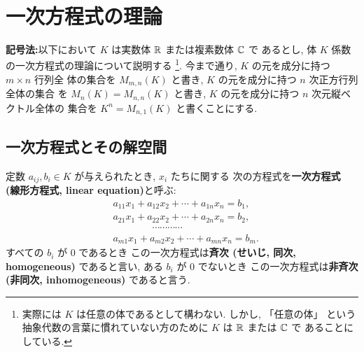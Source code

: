 \documentclass[12pt,twoside]{jarticle}
\begin{document}

\section{一次方程式の理論}

\noindent
{\large 
{\bf 記号法:}\enspace 以下において $K$ は実数体 ${\mathbb R}$ または複素数体 ${\mathbb C}$ で
あるとし, 体 $K$ 係数の一次方程式の理論について説明する%
\footnote{実際には $K$ は任意の体であるとして構わない. しかし, 「任意の体」
  という抽象代数の言葉に慣れていない方のために $K$ は ${\mathbb R}$ または ${\mathbb C}$ で
  あることにしている.}.  今まで通り, $K$ の元を成分に持つ $m\times n$ 行列全
体の集合を $M_{m,n}(K)$ と書き, $K$ の元を成分に持つ $n$ 次正方行列全体の集合
を $M_n(K)=M_{n,n}(K)$ と書き, $K$ の元を成分に持つ $n$ 次元縦ベクトル全体の
集合を $K^n = M_{n,1}(K)$ と書くことにする.
}


\subsection{一次方程式とその解空間}
\label{sec:def-lin-eq}

定数 $a_{ij},b_i\in K$ が与えられたとき, $x_i$ たちに関する
次の方程式を{\bf 一次方程式 (線形方程式, linear equation)}と呼ぶ:
\begin{align*}
  &
  a_{11}x_1 + a_{12}x_2 + \cdots + a_{1n}x_n = b_1, 
  \\ &
  a_{21}x_1 + a_{22}x_2 + \cdots + a_{2n}x_n = b_2, 
  \\ &
  \qquad\qquad\cdots\cdots\cdots\cdots
  \\ &
  a_{m1}x_1 + a_{m2}x_2 + \cdots + a_{mn}x_n = b_m.
\end{align*}
すべての $b_i$ が $0$ であるとき
この一次方程式は{\bf 斉次 (せいじ, 同次, homogeneous)} であると言い,
ある $b_i$ が $0$ でないとき
この一次方程式は{\bf 非斉次 (非同次, inhomogeneous)} であると言う.
\end{document}
